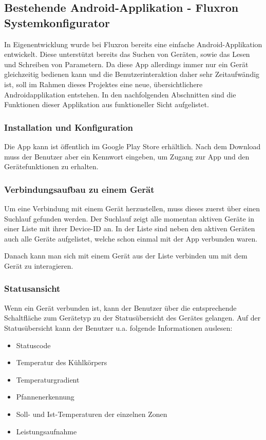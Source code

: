 \subsection{Bestehende Android-Applikation - Fluxron Systemkonfigurator }
\label{subsec:Bestehende Smartphone-Applikation}
In Eigenentwicklung wurde bei Fluxron bereits eine einfache Android-Applikation entwickelt. Diese unterstützt bereits das Suchen von Geräten, sowie das Lesen und Schreiben von Parametern. Da diese App allerdings immer nur ein Gerät gleichzeitig bedienen kann und die Benutzerinteraktion daher sehr Zeitaufwändig ist, soll im Rahmen dieses Projektes eine neue, übersichtlichere Androidapplikation entstehen. In den nachfolgenden Abschnitten sind die Funktionen dieser Applikation aus funktioneller Sicht aufgelistet.


\subsubsection{Installation und Konfiguration}
\label{subsubsec:Installation und Konfiguration}
Die App kann ist öffentlich im Google Play Store erhältlich. Nach dem Download muss der Benutzer aber ein Kennwort eingeben, um Zugang zur App und den Gerätefunktionen zu erhalten.

\subsubsection{Verbindungsaufbau zu einem Gerät}
\label{subsubsec:Verbindungsaufbau zu einem Gerät}
Um eine Verbindung mit einem Gerät herzustellen, muss dieses zuerst über einen Suchlauf gefunden werden. Der Suchlauf zeigt alle momentan aktiven Geräte in einer Liste mit ihrer Device-ID an. In der Liste sind neben den aktiven Geräten auch alle Geräte aufgelistet, welche schon einmal mit der App verbunden waren.

Danach kann man sich mit einem Gerät aus der Liste verbinden um mit dem Gerät zu interagieren.

\subsubsection{Statusansicht}
\label{subsubsec:Statusansicht}
Wenn ein Gerät verbunden ist, kann der Benutzer über die entsprechende Schaltfläche zum Gerätetyp zu der Statusübersicht des Gerätes gelangen. Auf der Statusübersicht kann der Benutzer u.a. folgende Informationen auslesen:
\begin{itemize}
\item Statuscode
\item Temperatur des Kühlkörpers
\item Temperaturgradient
\item Pfannenerkennung
\item Soll- und Ist-Temperaturen der einzelnen Zonen
\item Leistungsaufnahme
\end{itemize}

